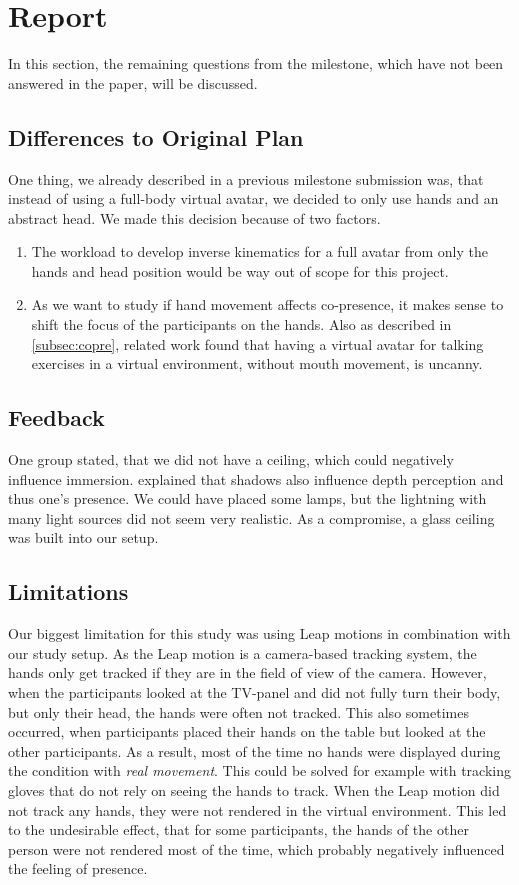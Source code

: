 \documentclass[english,runningheads,a4paper]{llncs}[2018/03/10]
\begin{document}
\section{Report}
\label{sec:report}
In this section, the remaining questions from the milestone, which have not been answered in the paper, will be discussed. 

\subsection{Differences to Original Plan}
\label{subsec:diff}
One thing, we already described in a previous milestone submission was, that instead of using a full-body virtual avatar, we decided to only use hands and an abstract head. 
We made this decision because of two factors. 
\begin{enumerate}
    \item The workload to develop inverse kinematics for a full avatar from only the hands and head position would be way out of scope for this project.
    \item As we want to study if hand movement affects co-presence, it makes sense to shift the focus of the participants on the hands. Also as described in \cref{subsec:copre}, related work found that having a virtual avatar for talking exercises in a virtual environment, without mouth movement, is uncanny.
\end{enumerate}

\subsection{Feedback}
One group stated, that we did not have a ceiling, which could negatively influence immersion. 
\citet{slater_influence} explained that shadows also influence depth perception and thus one's presence. 
We could have placed some lamps, but the lightning with many light sources did not seem very realistic. 
As a compromise, a glass ceiling was built into our setup.

\subsection{Limitations}
Our biggest limitation for this study was using Leap motions in combination with our study setup.
As the Leap motion is a camera-based tracking system, the hands only get tracked if they are in the field of view of the camera.
However, when the participants looked at the TV-panel and did not fully turn their body, but only their head, the hands were often not tracked. 
This also sometimes occurred, when participants placed their hands on the table but looked at the other participants. 
As a result, most of the time no hands were displayed during the condition with \textit{real movement}.
This could be solved for example with tracking gloves that do not rely on seeing the hands to track. 
When the Leap motion did not track any hands, they were not rendered in the virtual environment.
This led to the undesirable effect, that for some participants, the hands of the other person were not rendered most of the time, which probably negatively influenced the feeling of presence.
\end{document}
